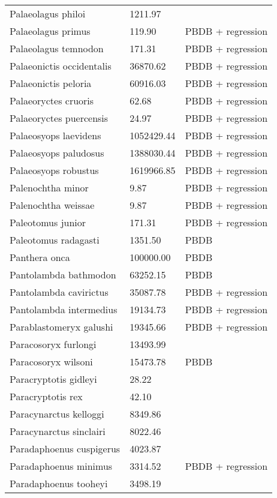 \begin{center}
\begin{longtable}{p{} p{} p{} }
  Palaeolagus philoi & 1211.97 & \cite{Tomiya2013} \\ 
  Palaeolagus primus & 119.90 & PBDB + regression \\ 
  Palaeolagus temnodon & 171.31 & PBDB + regression \\ 
  Palaeonictis occidentalis & 36870.62 & PBDB + regression \\ 
  Palaeonictis peloria & 60916.03 & PBDB + regression \\ 
  Palaeoryctes cruoris & 62.68 & PBDB + regression \\ 
  Palaeoryctes puercensis & 24.97 & PBDB + regression \\ 
  Palaeosyops laevidens & 1052429.44 & PBDB + regression \\ 
  Palaeosyops paludosus & 1388030.44 & PBDB + regression \\ 
  Palaeosyops robustus & 1619966.85 & PBDB + regression \\ 
  Palenochtha minor & 9.87 & PBDB + regression \\ 
  Palenochtha weissae & 9.87 & PBDB + regression \\ 
  Paleotomus junior & 171.31 & PBDB + regression \\ 
  Paleotomus radagasti & 1351.50 & PBDB \\ 
  Panthera onca & 100000.00 & PBDB \\ 
  Pantolambda bathmodon & 63252.15 & PBDB \\ 
  Pantolambda cavirictus & 35087.78 & PBDB + regression \\ 
  Pantolambda intermedius & 19134.73 & PBDB + regression \\ 
  Parablastomeryx galushi & 19345.66 & PBDB + regression \\ 
  Paracosoryx furlongi & 13493.99 & \cite{Tomiya2013} \\ 
  Paracosoryx wilsoni & 15473.78 & PBDB \\ 
  Paracryptotis gidleyi & 28.22 & \cite{Tomiya2013} \\ 
  Paracryptotis rex & 42.10 & \cite{Tomiya2013} \\ 
  Paracynarctus kelloggi & 8349.86 & \cite{Tomiya2013} \\ 
  Paracynarctus sinclairi & 8022.46 & \cite{Tomiya2013} \\ 
  Paradaphoenus cuspigerus & 4023.87 & \cite{Tomiya2013} \\ 
  Paradaphoenus minimus & 3314.52 & PBDB + regression \\ 
  Paradaphoenus tooheyi & 3498.19 & \cite{Tomiya2013} \\ 

\end{longtable}
\end{center}
